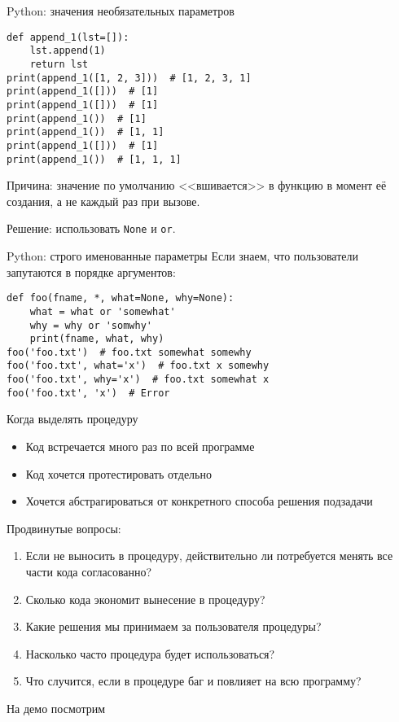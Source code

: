 \begin{frame}[t,fragile]{Python: значения необязательных параметров}
\begin{verbatim}
def append_1(lst=[]):
    lst.append(1)
    return lst
print(append_1([1, 2, 3]))  # [1, 2, 3, 1]
print(append_1([]))  # [1]
print(append_1([]))  # [1]
print(append_1())  # [1]
print(append_1())  # [1, 1]
print(append_1([]))  # [1]
print(append_1())  # [1, 1, 1]
\end{verbatim}
	Причина: значение по умолчанию <<вшивается>> в функцию в момент её создания, а не каждый раз при вызове.
	
	Решение: использовать \verb`None` и \verb`or`.
\end{frame}

\begin{frame}[t,fragile]{Python: строго именованные параметры}
	Если знаем, что пользователи запутаются в порядке аргументов:
\begin{verbatim}
def foo(fname, *, what=None, why=None):
    what = what or 'somewhat'
    why = why or 'somwhy'
    print(fname, what, why)
foo('foo.txt')  # foo.txt somewhat somewhy
foo('foo.txt', what='x')  # foo.txt x somewhy
foo('foo.txt', why='x')  # foo.txt somewhat x
foo('foo.txt', 'x')  # Error
\end{verbatim}
\end{frame}

\begin{frame}{Когда выделять процедуру}
	\begin{itemize}
	\item Код встречается много раз по всей программе
	\item Код хочется протестировать отдельно
	\item Хочется абстрагироваться от конкретного способа решения подзадачи
	\end{itemize}
	
	Продвинутые вопросы:
	\begin{enumerate}
	\item
		Если не выносить в процедуру, действительно ли потребуется
		менять все части кода согласованно?
	\item
		Сколько кода экономит вынесение в процедуру?
	\item
		Какие решения мы принимаем за пользователя процедуры?
	\item
		Насколько часто процедура будет использоваться?
	\item
		Что случится, если в процедуре баг и повлияет на всю программу?
	\end{enumerate}

	На демо посмотрим
\end{frame}

